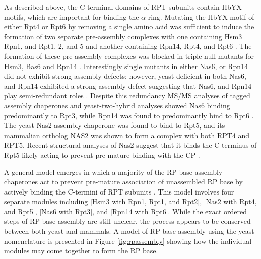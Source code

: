 	As described above, the C-terminal domains of RPT subunits contain HbYX motifs, which are important for binding the $\alpha$-ring. Mutating the HbYX motif of either Rpt4 or Rpt6 by removing a single amino acid was sufficient to induce the formation of two separate pre-assembly complexes with one containing Hsm3 Rpn1, and Rpt1, 2, and 5 and another containing Rpn14, Rpt4, and Rpt6 \citep{park09}. The formation of these pre-assembly complexes was blocked in triple null mutants for Hsm3, Bas6 and Rpn14 \citep{park09}. Interestingly single mutants in either Nas6, or Rpn14 did not exhibit strong assembly defects; however, yeast deficient in both Nas6, and Rpn14 exhibited a strong assembly defect suggesting that Nas6, and Rpn14 play semi-redundant roles \citep{saeki09}. Despite this redundancy MS/MS analyses of tagged assembly chaperones and yeast-two-hybrid analyses showed Nas6 binding predominantly to Rpt3, while Rpn14 was found to predominantly bind to Rpt6 \citep{saeki09}.  The yeast Nas2 assembly chaperone was found to bind to Rpt5, and its mammalian ortholog NAS2 was shown to form a complex with both RPT4 and RPT5. Recent structural analyses of Nas2 suggest that it binds the C-terminus of Rpt5 likely acting to prevent pre-mature binding with the CP \citep{satoh14}.

	A general model emerges in which a majority of the RP base assembly chaperones act to prevent pre-mature association of unassembled RP base by actively binding the C-termini of RPT subunits \citep{tomko13}. This model involves four separate modules including [Hsm3 with Rpn1, Rpt1, and Rpt2], [Nas2 with Rpt4, and Rpt5], [Nas6 with Rpt3], and [Rpn14 with Rpt6].  While the exact ordered steps of RP base assembly are still unclear, the process appears to be conserved between both yeast and mammals. A model of RP base assembly using the yeast nomenclature is presented in Figure \ref{fig:rpassembly} showing how the individual modules may come together to form the RP base.

